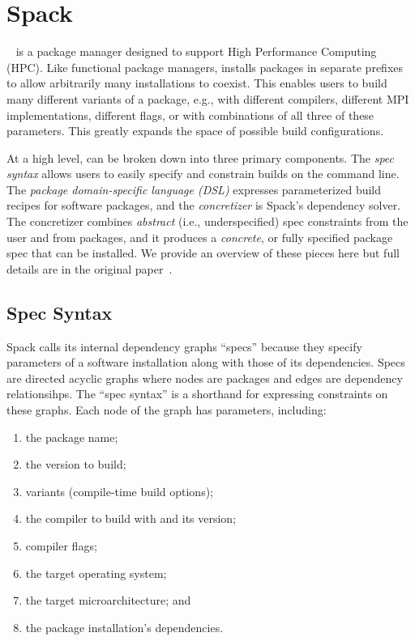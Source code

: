 \section{Spack}
\label{sec:software-model}

\spack~\cite{gamblin+:sc15} is a package manager designed to support High Performance
Computing (HPC). Like functional package managers, \spack installs packages in separate
prefixes to allow arbitrarily many installations to coexist. This enables users to build
many different variants of a package, e.g., with different compilers, different MPI
implementations, different flags, or with combinations of all three of these parameters.
This greatly expands the space of possible build configurations.

At a high level, \spack can be broken down into three primary components. The {\it spec
  syntax} allows users to easily specify and constrain builds on the command line. The
{\it package domain-specific language (DSL)} expresses parameterized build recipes for
software packages, and the {\it concretizer} is Spack's dependency solver. The
concretizer combines {\it abstract} (i.e., underspecified) spec constraints from the
user and from packages, and it produces a {\it concrete}, or fully specified package
spec that can be installed. We provide an overview of these pieces here but full details
are in the original paper~\cite{gamblin+:sc15}.

\subsection{Spec Syntax}

Spack calls its internal dependency graphs ``specs'' because they specify parameters of
a software installation along with those of its dependencies. Specs are directed acyclic
graphs where nodes are packages and edges are dependency relationsihps. The ``spec
syntax'' is a shorthand for expressing constraints on these graphs. Each node of the
graph has parameters, including:
\begin{enumerate}
\item the package name;
\item the version to build;
\item variants (compile-time build options);
\item the compiler to build with and its version;
\item compiler flags;
\item the target operating system;
\item the target microarchitecture; and
\item the package installation's dependencies.
\end{enumerate}

